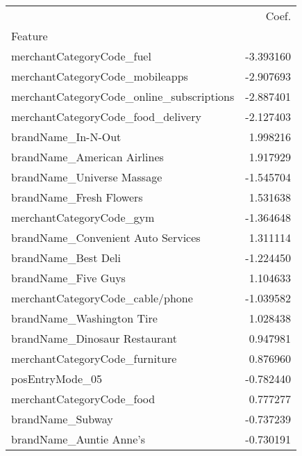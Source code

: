 \begin{tabu}{lr}
\toprule
 & Coef. \\
Feature &  \\
\midrule
merchantCategoryCode\_fuel & -3.393160 \\
merchantCategoryCode\_mobileapps & -2.907693 \\
merchantCategoryCode\_online\_subscriptions & -2.887401 \\
merchantCategoryCode\_food\_delivery & -2.127403 \\
brandName\_In-N-Out & 1.998216 \\
brandName\_American Airlines & 1.917929 \\
brandName\_Universe Massage & -1.545704 \\
brandName\_Fresh Flowers & 1.531638 \\
merchantCategoryCode\_gym & -1.364648 \\
brandName\_Convenient Auto Services & 1.311114 \\
brandName\_Best Deli & -1.224450 \\
brandName\_Five Guys & 1.104633 \\
merchantCategoryCode\_cable/phone & -1.039582 \\
brandName\_Washington Tire & 1.028438 \\
brandName\_Dinosaur Restaurant & 0.947981 \\
merchantCategoryCode\_furniture & 0.876960 \\
posEntryMode\_05 & -0.782440 \\
merchantCategoryCode\_food & 0.777277 \\
brandName\_Subway & -0.737239 \\
brandName\_Auntie Anne's & -0.730191 \\
\bottomrule
\end{tabu}
